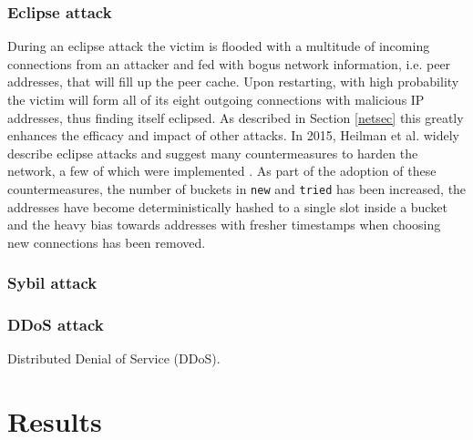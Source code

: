 \documentclass[12pt, letterpaper, twoside]{article}
\begin{document}
\subsubsection{Eclipse attack}\label{eclipse}
During an eclipse attack the victim is flooded with a multitude of incoming connections from an attacker and fed with bogus network information, i.e. peer addresses, that will fill up the peer cache. Upon restarting, with high probability the victim will form all of its eight outgoing connections with malicious IP addresses, thus finding itself eclipsed. As described in Section \ref{netsec} this greatly enhances the efficacy and impact of other attacks. In 2015, Heilman et al. widely describe eclipse attacks and suggest many countermeasures to harden the network, a few of which were implemented \cite{eclipseatk}. As part of the adoption of these countermeasures, the number of buckets in \texttt{new} and \texttt{tried} has been increased, the addresses have become deterministically hashed to a single slot inside a bucket and the heavy bias towards addresses with fresher timestamps when choosing new connections has been removed.

\subsubsection{Sybil attack}\label{sybil}

\subsubsection{DDoS attack}\label{ddos}
Distributed Denial of Service (DDoS).

\section{Results}\label{res}




















\end{document}
